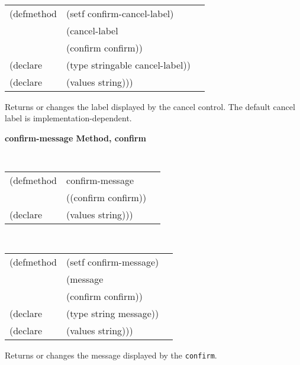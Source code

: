 {\samepage
\begin{flushright} \parbox[t]{6.125in}{
\tt
\begin{tabular}{lll}
\raggedright
(defmethod & (setf confirm-cancel-label) & \\
         & (cancel-label \\
         & (confirm confirm)) \\
(declare &(type stringable  cancel-label))\\
(declare & (values string)))
\end{tabular}
\rm
}
\end{flushright}}

\begin{flushright} \parbox[t]{6.125in}{
Returns or changes the label displayed by the cancel control. The default cancel
label is implementation-dependent.

}\end{flushright}



{\samepage
{\large {\bf confirm-message \hfill Method, confirm}}
\begin{flushright} \parbox[t]{6.125in}{
\tt
\begin{tabular}{lll}
\raggedright
(defmethod & confirm-message & \\
           & ((confirm  confirm)) \\
(declare & (values string)))
\end{tabular}
\rm

}\end{flushright}}

{\samepage
\begin{flushright} \parbox[t]{6.125in}{
\tt
\begin{tabular}{lll}
\raggedright
(defmethod & (setf confirm-message) & \\
         & (message \\
         & (confirm confirm)) \\
(declare &(type string  message))\\
(declare & (values string)))
\end{tabular}
\rm
}
\end{flushright}}


\begin{flushright} \parbox[t]{6.125in}{
Returns or changes the message displayed by the {\tt confirm}.

}\end{flushright}


